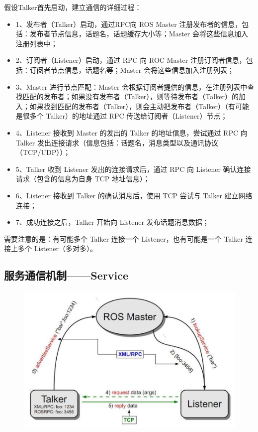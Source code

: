 \documentclass[10pt, oneside]{book}
\begin{document}
假设Talker首先启动，建立通信的详细过程：

\begin{itemize}
    \item 1、发布者（Talker）启动，通过RPC向 ROS Master 注册发布者的信息，包括：发布者节点信息，话题名，话题缓存大小等；Master 会将这些信息加入注册列表中；
    \item 2、订阅者（Listener）启动，通过 RPC 向 ROC Master 注册订阅者信息，包括：订阅者节点信息，话题名等；Master 会将这些信息加入注册列表；
    \item 3、Master 进行节点匹配：Master 会根据订阅者提供的信息，在注册列表中查找匹配的发布者；如果没有发布者（Talker），则等待发布者（Talker）的加入；如果找到匹配的发布者（Talker），则会主动把发布者（Talker）（有可能是很多个 Talker）的地址通过 RPC 传送给订阅者（Listener）节点；
    \item 4、Listener 接收到 Master 的发出的 Talker 的地址信息，尝试通过 RPC 向 Talker 发出连接请求（信息包括：话题名，消息类型以及通讯协议（TCP/UDP））；
    \item 5、Talker 收到 Listener 发出的连接请求后，通过 RPC 向 Listener 确认连接请求（包含的信息为自身 TCP 地址信息）；
    \item 6、Listener 接收到 Talker 的确认消息后，使用 TCP 尝试与 Talker 建立网络连接；
    \item 7、成功连接之后，Talker 开始向 Listener 发布话题消息数据；
\end{itemize}

需要注意的是：有可能多个 Talker 连接一个 Listener，也有可能是一个 Talker 连接上多个 Listener（多对多）。

\subsection{服务通信机制——Service}

\begin{figure}[H]
    \centering
    \includegraphics[width=0.7\linewidth]{image/服务通信机制.jpg}
\end{figure}
\end{document}
